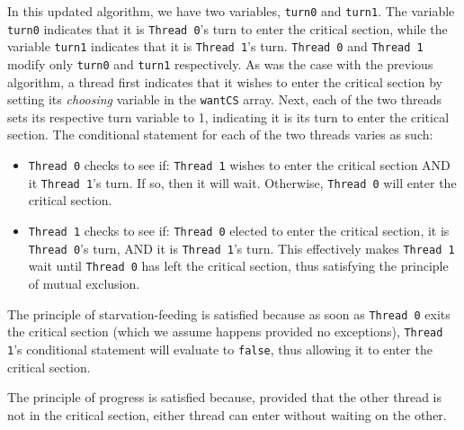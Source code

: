 \documentclass[11pt]{article}
\begin{document}
\begin{enumerate}

In this updated algorithm, we have two variables, \texttt{turn0} and \texttt{turn1}. The variable \texttt{turn0} indicates that it is \texttt{Thread 0}'s turn to enter the critical section, while the variable \texttt{turn1} indicates that it is \texttt{Thread 1}'s turn. \texttt{Thread 0} and \texttt{Thread 1} modify only \texttt{turn0} and \texttt{turn1} respectively. As was the case with the previous algorithm, a thread first indicates that it wishes to enter the critical section by setting its \emph{choosing} variable in the \texttt{wantCS} array.  Next, each of the two threads sets its respective turn variable to 1, indicating it is its turn to enter the critical section. The conditional statement for each of the two threads varies as such:
\begin{itemize}
\item \texttt{Thread 0} checks to see if: \texttt{Thread 1} wishes to enter the critical section AND it \texttt{Thread 1}'s turn. If so, then it will wait. Otherwise, \texttt{Thread 0} will enter the critical section. 
\item \texttt{Thread 1} checks to see if: \texttt{Thread 0} elected to enter the critical section, it is \texttt{Thread 0}'s turn, AND it is \texttt{Thread 1}'s turn. This effectively makes \texttt{Thread 1} wait until \texttt{Thread 0} has left the critical section, thus satisfying the principle of mutual exclusion.
\end{itemize}
The principle of starvation-feeding is satisfied because as soon as \texttt{Thread 0} exits the critical section (which we assume happens provided no exceptions), \texttt{Thread 1}'s conditional statement will evaluate to \texttt{false}, thus allowing it to enter the critical section.  

The principle of progress is satisfied because, provided that the other thread is not in the critical section, either thread can enter without waiting on the other.


\end{enumerate}
\end{document}
